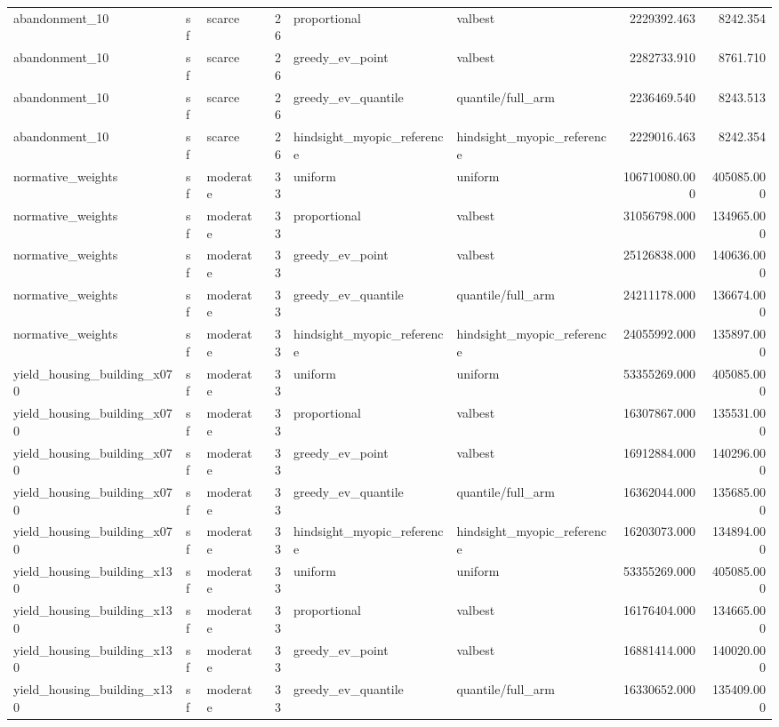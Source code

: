\begin{tabular}{lllrllrr}
abandonment\_10 & sf & scarce & 26 & proportional & valbest & 2229392.463 & 8242.354 \\
abandonment\_10 & sf & scarce & 26 & greedy\_ev\_point & valbest & 2282733.910 & 8761.710 \\
abandonment\_10 & sf & scarce & 26 & greedy\_ev\_quantile & quantile/full\_arm & 2236469.540 & 8243.513 \\
abandonment\_10 & sf & scarce & 26 & hindsight\_myopic\_reference & hindsight\_myopic\_reference & 2229016.463 & 8242.354 \\
normative\_weights & sf & moderate & 33 & uniform & uniform & 106710080.000 & 405085.000 \\
normative\_weights & sf & moderate & 33 & proportional & valbest & 31056798.000 & 134965.000 \\
normative\_weights & sf & moderate & 33 & greedy\_ev\_point & valbest & 25126838.000 & 140636.000 \\
normative\_weights & sf & moderate & 33 & greedy\_ev\_quantile & quantile/full\_arm & 24211178.000 & 136674.000 \\
normative\_weights & sf & moderate & 33 & hindsight\_myopic\_reference & hindsight\_myopic\_reference & 24055992.000 & 135897.000 \\
yield\_housing\_building\_x070 & sf & moderate & 33 & uniform & uniform & 53355269.000 & 405085.000 \\
yield\_housing\_building\_x070 & sf & moderate & 33 & proportional & valbest & 16307867.000 & 135531.000 \\
yield\_housing\_building\_x070 & sf & moderate & 33 & greedy\_ev\_point & valbest & 16912884.000 & 140296.000 \\
yield\_housing\_building\_x070 & sf & moderate & 33 & greedy\_ev\_quantile & quantile/full\_arm & 16362044.000 & 135685.000 \\
yield\_housing\_building\_x070 & sf & moderate & 33 & hindsight\_myopic\_reference & hindsight\_myopic\_reference & 16203073.000 & 134894.000 \\
yield\_housing\_building\_x130 & sf & moderate & 33 & uniform & uniform & 53355269.000 & 405085.000 \\
yield\_housing\_building\_x130 & sf & moderate & 33 & proportional & valbest & 16176404.000 & 134665.000 \\
yield\_housing\_building\_x130 & sf & moderate & 33 & greedy\_ev\_point & valbest & 16881414.000 & 140020.000 \\
yield\_housing\_building\_x130 & sf & moderate & 33 & greedy\_ev\_quantile & quantile/full\_arm & 16330652.000 & 135409.000 \\

\end{tabular}
